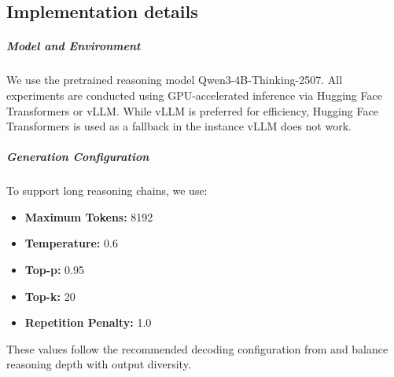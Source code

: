 \documentclass{article}
\begin{document}
% 
\subsection{Implementation details}
\label{sec:implementation_details}

\subparagraph{Model and Environment} We use the pretrained reasoning model Qwen3-4B-Thinking-2507. All experiments are conducted using GPU-accelerated inference via Hugging Face Transformers or vLLM. While vLLM is preferred for efficiency, Hugging Face Transformers is used as a fallback in the instance vLLM does not work.

\subparagraph{Generation Configuration} To support long reasoning chains, we use:
\begin{itemize}
    \item \textbf{Maximum Tokens:} 8192
    \item \textbf{Temperature:} 0.6
    \item \textbf{Top-p:} 0.95
    \item \textbf{Top-k:} 20
    \item \textbf{Repetition Penalty:} 1.0
\end{itemize}
These values follow the recommended decoding configuration from \citet{qwen3} and balance reasoning depth with output diversity.
\end{document}

